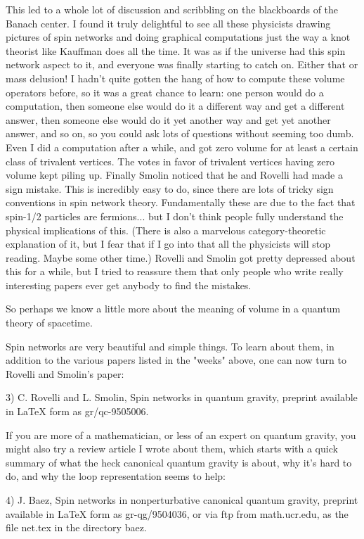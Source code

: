 This led to a whole lot of discussion and scribbling on the blackboards
of the Banach center.  I found it truly delightful to see all these 
physicists drawing pictures of spin networks and doing graphical computations
just the way a knot theorist like Kauffman does all the time.  It was as
if the universe had this spin network aspect to it, and everyone was
finally starting to catch on.  Either that or mass delusion!  I hadn't
quite gotten the hang of how to compute these volume operators before,
so it was a great chance to learn: one person would do a computation,
then someone else would do it a different way and get a different answer,
then someone else would do it yet another way and get yet another answer,
and so on, so you could ask lots of questions without seeming too dumb.  
Even I did a computation after a while, and got zero volume for at least
a certain class of trivalent vertices.  The votes in favor of trivalent 
vertices having zero volume kept piling up.  Finally Smolin noticed 
that he and Rovelli had made a sign mistake.  This is incredibly easy to do, 
since there are lots of tricky sign conventions in spin network
theory.  Fundamentally these are due to the fact that spin-1/2 particles
are fermions... but I don't think people fully understand the physical
implications of this.  (There is also a marvelous category-theoretic explanation
of it, but I fear that if I go into that all the physicists will stop
reading.  Maybe some other time.)  Rovelli and Smolin got pretty depressed
about this for a while, but I tried to reassure them that only people
who write really interesting papers ever get anybody to find the
mistakes.   

So perhaps we know a little more about the meaning of volume in a
quantum theory of spacetime.

Spin networks are very beautiful and simple things.  To learn about them, 
in addition to the various papers listed in the "weeks" above, one can 
now turn to Rovelli and Smolin's paper:

3) C. Rovelli and L. Smolin, Spin networks in quantum gravity, preprint
available in LaTeX form as gr/qc-9505006.

If you are more of a mathematician, or less of an expert on quantum gravity,
you might also try a review article I wrote about them, which starts with a
quick summary of what the heck canonical quantum gravity is about, why it's
hard to do, and why the loop representation seems to help:

4) J. Baez, Spin networks in nonperturbative canonical quantum gravity,
preprint available in LaTeX form as gr-qg/9504036, or via ftp from 
math.ucr.edu, as the file net.tex in the directory baez.

